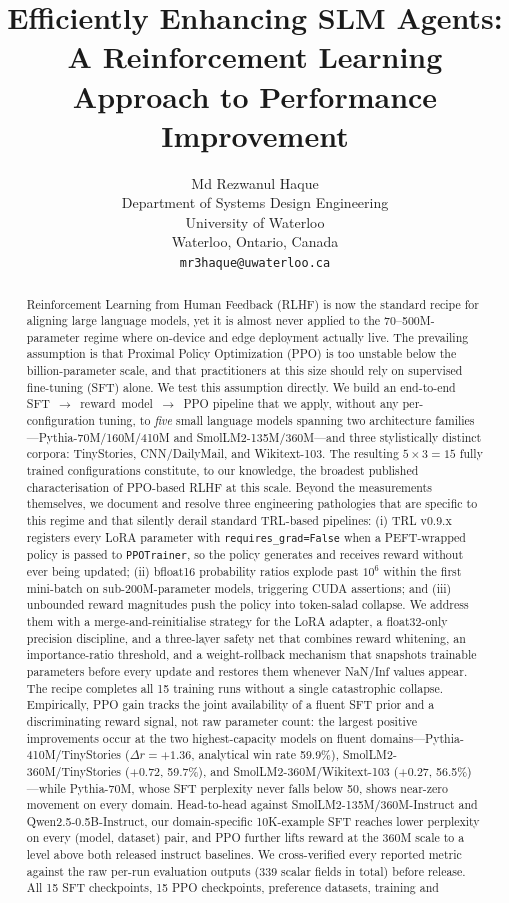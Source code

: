 \documentclass[10pt,twocolumn,letterpaper]{article}
\title{Efficiently Enhancing SLM Agents: A Reinforcement Learning\\
       Approach to Performance Improvement}
\author{
  Md Rezwanul Haque\\
  Department of Systems Design Engineering\\
  University of Waterloo\\
  Waterloo, Ontario, Canada\\
  {\tt\small mr3haque@uwaterloo.ca}
}
\date{}
\begin{document}
\maketitle

\begin{abstract}
Reinforcement Learning from Human Feedback (RLHF) is now the standard recipe for aligning large language models, yet it is almost never applied to the 70--500M-parameter regime where on-device and edge deployment actually live. The prevailing assumption is that Proximal Policy Optimization (PPO) is too unstable below the billion-parameter scale, and that practitioners at this size should rely on supervised fine-tuning (SFT) alone. We test this assumption directly. We build an end-to-end SFT~$\to$~reward~model~$\to$~PPO pipeline that we apply, without any per-configuration tuning, to \emph{five} small language models spanning two architecture families---Pythia-70M/160M/410M and SmolLM2-135M/360M---and three stylistically distinct corpora: TinyStories, CNN/DailyMail, and Wikitext-103. The resulting $5\times3=15$ fully trained configurations constitute, to our knowledge, the broadest published characterisation of PPO-based RLHF at this scale. Beyond the measurements themselves, we document and resolve three engineering pathologies that are specific to this regime and that silently derail standard TRL-based pipelines: (i) TRL v0.9.x registers every LoRA parameter with \texttt{requires\_grad=False} when a PEFT-wrapped policy is passed to \texttt{PPOTrainer}, so the policy generates and receives reward without ever being updated; (ii) bfloat16 probability ratios explode past $10^6$ within the first mini-batch on sub-200M-parameter models, triggering CUDA assertions; and (iii) unbounded reward magnitudes push the policy into token-salad collapse. We address them with a merge-and-reinitialise strategy for the LoRA adapter, a float32-only precision discipline, and a three-layer safety net that combines reward whitening, an importance-ratio threshold, and a weight-rollback mechanism that snapshots trainable parameters before every update and restores them whenever NaN/Inf values appear. The recipe completes all 15 training runs without a single catastrophic collapse. Empirically, PPO gain tracks the joint availability of a fluent SFT prior and a discriminating reward signal, not raw parameter count: the largest positive improvements occur at the two highest-capacity models on fluent domains---Pythia-410M/TinyStories ($\Delta r=+1.36$, analytical win rate 59.9\%), SmolLM2-360M/TinyStories ($+0.72$, 59.7\%), and SmolLM2-360M/Wikitext-103 ($+0.27$, 56.5\%)---while Pythia-70M, whose SFT perplexity never falls below 50, shows near-zero movement on every domain. Head-to-head against SmolLM2-135M/360M-Instruct and Qwen2.5-0.5B-Instruct, our domain-specific 10K-example SFT reaches lower perplexity on every (model, dataset) pair, and PPO further lifts reward at the 360M scale to a level above both released instruct baselines. We cross-verified every reported metric against the raw per-run evaluation outputs (339 scalar fields in total) before release. All 15 SFT checkpoints, 15 PPO checkpoints, preference datasets, training and 
\end{abstract}
\end{document}
